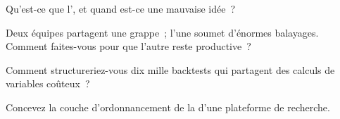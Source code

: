 \begin{interviewq}\label{iq:pl:distributed-compute-and-schedulers:2}
Qu'est-ce que l', et quand est-ce une mauvaise idée~?
\end{interviewq}

\begin{interviewq}\label{iq:pl:distributed-compute-and-schedulers:3}
Deux équipes partagent une grappe~; l'une soumet d'énormes balayages. Comment faites-vous pour que l'autre reste productive~?
\end{interviewq}

\begin{interviewq}\label{iq:pl:distributed-compute-and-schedulers:4}
Comment structureriez-vous dix mille backtests qui partagent des calculs de variables coûteux~?
\end{interviewq}

\begin{interviewq}\label{iq:pl:distributed-compute-and-schedulers:5}
Concevez la couche d'ordonnancement de la  d'une plateforme de recherche.
\end{interviewq}
